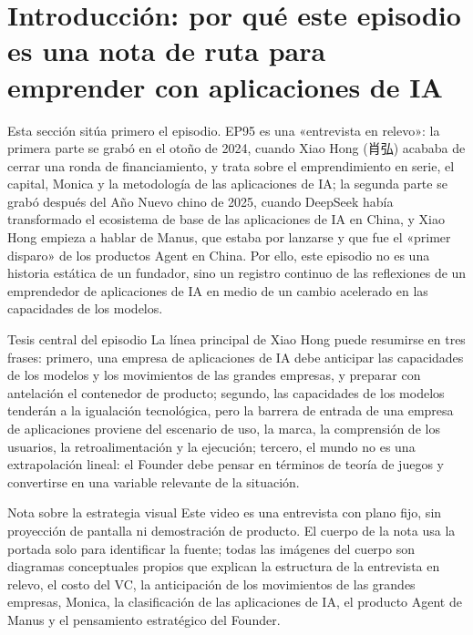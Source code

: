 \documentclass[a4paper]{article}
\begin{document}
\section{Introducción: por qué este episodio es una nota de ruta para emprender con aplicaciones de IA}

Esta sección sitúa primero el episodio. EP95 es una «entrevista en relevo»: la primera parte se grabó en el otoño de 2024, cuando Xiao Hong (肖弘) acababa de cerrar una ronda de financiamiento, y trata sobre el emprendimiento en serie, el capital, Monica y la metodología de las aplicaciones de IA; la segunda parte se grabó después del Año Nuevo chino de 2025, cuando DeepSeek había transformado el ecosistema de base de las aplicaciones de IA en China, y Xiao Hong empieza a hablar de Manus, que estaba por lanzarse y que fue el «primer disparo» de los productos Agent en China. Por ello, este episodio no es una historia estática de un fundador, sino un registro continuo de las reflexiones de un emprendedor de aplicaciones de IA en medio de un cambio acelerado en las capacidades de los modelos.

\begin{importantbox}{Tesis central del episodio}
La línea principal de Xiao Hong puede resumirse en tres frases: primero, una empresa de aplicaciones de IA debe anticipar las capacidades de los modelos y los movimientos de las grandes empresas, y preparar con antelación el contenedor de producto; segundo, las capacidades de los modelos tenderán a la igualación tecnológica, pero la barrera de entrada de una empresa de aplicaciones proviene del escenario de uso, la marca, la comprensión de los usuarios, la retroalimentación y la ejecución; tercero, el mundo no es una extrapolación lineal: el Founder debe pensar en términos de teoría de juegos y convertirse en una variable relevante de la situación.
\end{importantbox}

\begin{knowledgebox}{Nota sobre la estrategia visual}
Este video es una entrevista con plano fijo, sin proyección de pantalla ni demostración de producto. El cuerpo de la nota usa la portada solo para identificar la fuente; todas las imágenes del cuerpo son diagramas conceptuales propios que explican la estructura de la entrevista en relevo, el costo del VC, la anticipación de los movimientos de las grandes empresas, Monica, la clasificación de las aplicaciones de IA, el producto Agent de Manus y el pensamiento estratégico del Founder.
\end{knowledgebox}
\end{document}
